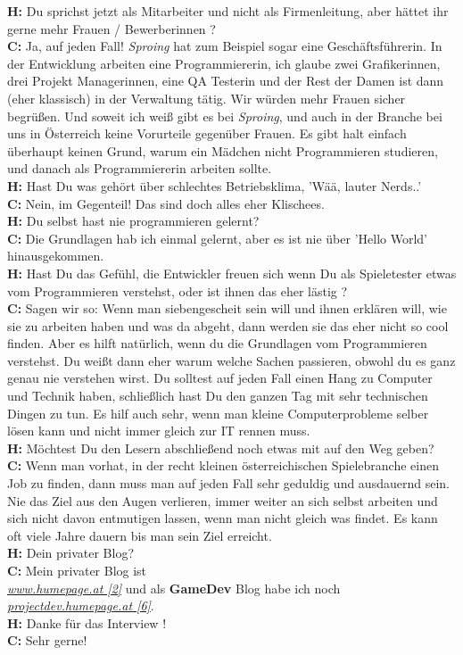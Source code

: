 \documentclass[10pt,a4paper,ngerman,twoside]{article} %
\begin{document}
\begin{multicols}{3}
\textbf{H:} Du sprichst jetzt als Mitarbeiter und nicht als Firmenleitung, aber hättet ihr gerne mehr Frauen / Bewerberinnen ? \\
\textbf{C:} Ja, auf jeden Fall! \textit{Sproing} hat zum Beispiel sogar eine Geschäftsführerin. In der Entwicklung arbeiten eine Programmiererin, ich glaube zwei Grafikerinnen, drei Projekt Managerinnen, eine QA Testerin und der Rest der Damen ist dann (eher klassisch) in der Verwaltung tätig. Wir würden mehr Frauen sicher begrüßen. Und soweit ich weiß gibt es bei \textit{Sproing}, und auch in der Branche bei uns in Österreich keine Vorurteile gegenüber Frauen. Es gibt halt einfach überhaupt keinen Grund, warum ein Mädchen nicht Programmieren studieren, und danach als Programmiererin arbeiten sollte. \\
\textbf{H:} Hast Du was gehört über schlechtes Betriebsklima, 'Wää, lauter Nerds..' \\
\textbf{C:} Nein, im Gegenteil! Das sind doch alles eher Klischees. \\
\textbf{H:} Du selbst hast nie programmieren gelernt? \\
\textbf{C:} Die Grundlagen hab ich einmal gelernt, aber es ist nie über 'Hello World' hinausgekommen. \\
\textbf{H:} Hast Du das Gefühl, die Entwickler freuen sich wenn Du als Spieletester etwas vom Programmieren verstehst, oder ist ihnen das eher lästig ? \\
\textbf{C:} Sagen wir so: Wenn man siebengescheit sein will und ihnen erklären will, wie sie zu arbeiten haben und was da abgeht, dann werden sie das eher nicht so cool finden. Aber es hilft natürlich, wenn du die Grundlagen vom Programmieren verstehst. Du weißt dann eher warum welche Sachen passieren, obwohl du es ganz genau nie verstehen wirst. Du solltest auf jeden Fall einen Hang zu Computer und Technik haben, schließlich hast Du den ganzen Tag mit sehr technischen Dingen zu tun. Es hilf auch sehr, wenn man kleine Computerprobleme selber lösen kann und nicht immer gleich zur IT rennen muss. \\
\textbf{H:} Möchtest Du den Lesern abschließend noch etwas mit auf den Weg geben? \\
\textbf{C:} Wenn man vorhat, in der recht kleinen österreichischen Spielebranche einen Job zu finden, dann muss man auf jeden Fall sehr geduldig und ausdauernd sein. Nie das Ziel aus den Augen verlieren, immer weiter an sich selbst arbeiten und sich nicht davon entmutigen lassen, wenn man nicht gleich was findet. Es kann oft viele Jahre dauern bis man sein Ziel erreicht.  \\
\textbf{H:} Dein privater Blog? \\
\textbf{C:} Mein privater Blog ist \\ \href{http://www.humepage.at}{\textit{www.humepage.at [2]}}
und als \textbf{GameDev} Blog habe ich noch \\ \href{http://projectdev.humepage.at/}{\textit{projectdev.humepage.at [6]}}. \\
\textbf{H:} Danke für das Interview ! \\
\textbf{C:} Sehr gerne! \\


\end{multicols}
\end{document}
